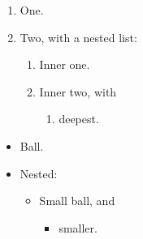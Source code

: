 \documentclass{beamer}
\begin{document}
\begin{frame}
\begin{enumerate}
\item One.
\item Two, with a nested list:
\begin{enumerate}
\item Inner one.
\item Inner two, with
\begin{enumerate}
\item deepest.
\end{enumerate}
\end{enumerate}
\end{enumerate}
\begin{itemize}
\item Ball.
\item Nested:
\begin{itemize}
\item Small ball, and
\begin{itemize}
\item smaller.
\end{itemize}
\end{itemize}
\end{itemize}
\end{frame}
\end{document}
